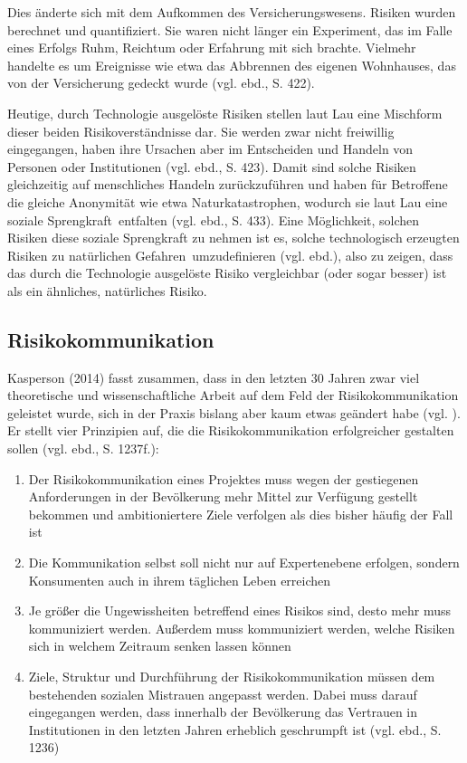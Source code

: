 Dies änderte sich mit dem Aufkommen des Versicherungswesens. Risiken wurden berechnet und quantifiziert. Sie waren nicht länger ein \glq Experiment\grq , das im Falle eines Erfolgs Ruhm, Reichtum oder Erfahrung mit sich brachte. Vielmehr handelte es um Ereignisse wie etwa das Abbrennen des eigenen Wohnhauses, das von der Versicherung gedeckt wurde (vgl. ebd., S. 422).

Heutige, durch Technologie ausgelöste Risiken stellen laut Lau eine Mischform dieser beiden Risikoverständnisse dar. Sie werden zwar nicht freiwillig eingegangen, haben ihre Ursachen aber im Entscheiden und Handeln von Personen oder Institutionen (vgl. ebd., S. 423). Damit sind solche Risiken gleichzeitig auf menschliches Handeln zurückzuführen und haben für Betroffene die gleiche Anonymität wie etwa Naturkatastrophen, wodurch sie laut Lau eine \glqq soziale Sprengkraft\grqq \, entfalten (vgl. ebd., S. 433). Eine Möglichkeit, solchen Risiken diese soziale Sprengkraft zu nehmen ist es, solche technologisch erzeugten Risiken zu \glq natürlichen Gefahren\grq \, umzudefinieren (vgl. ebd.), also zu zeigen, dass das durch die Technologie ausgelöste Risiko vergleichbar (oder sogar besser) ist als ein ähnliches, natürliches Risiko.

\subsection{Risikokommunikation}
Kasperson (2014) fasst zusammen, dass in den letzten 30 Jahren zwar viel theoretische und wissenschaftliche Arbeit auf dem Feld der Risikokommunikation geleistet wurde, sich in der Praxis bislang aber kaum etwas geändert habe (vgl. \cite[1234]{kasperson2014four}). Er stellt vier Prinzipien auf, die die Risikokommunikation erfolgreicher gestalten sollen (vgl. ebd., S. 1237f.):
\begin{enumerate}
  \item Der Risikokommunikation eines Projektes muss wegen der gestiegenen Anforderungen in der Bevölkerung mehr Mittel zur Verfügung gestellt bekommen und ambitioniertere Ziele verfolgen als dies bisher häufig der Fall ist
  \item Die Kommunikation selbst soll nicht nur auf Expertenebene erfolgen, sondern Konsumenten auch in ihrem täglichen Leben erreichen
  \item Je größer die Ungewissheiten betreffend eines Risikos sind, desto mehr muss kommuniziert werden. Außerdem muss kommuniziert werden, welche Risiken sich in welchem Zeitraum senken lassen können
  \item Ziele, Struktur und Durchführung der Risikokommunikation müssen dem bestehenden sozialen Mistrauen angepasst werden. Dabei muss darauf eingegangen werden, dass innerhalb der Bevölkerung das Vertrauen in Institutionen in den letzten Jahren erheblich geschrumpft ist (vgl. ebd., S. 1236)
\end{enumerate}

